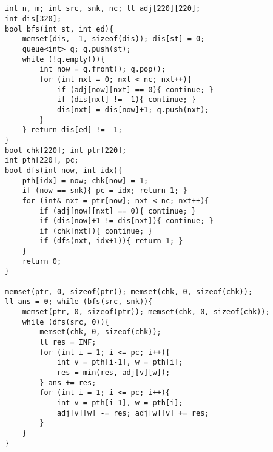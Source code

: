 \documentclass[landscape, 8pt, a4paper, oneside, twocolumn]{extarticle}
\begin{document}
\subsection{}
\begin{verbatim}
int n, m; int src, snk, nc; ll adj[220][220];
int dis[320];
bool bfs(int st, int ed){
    memset(dis, -1, sizeof(dis)); dis[st] = 0;
    queue<int> q; q.push(st);
    while (!q.empty()){
        int now = q.front(); q.pop();
        for (int nxt = 0; nxt < nc; nxt++){
            if (adj[now][nxt] == 0){ continue; }
            if (dis[nxt] != -1){ continue; }
            dis[nxt] = dis[now]+1; q.push(nxt);
        }
    } return dis[ed] != -1;
}
bool chk[220]; int ptr[220];
int pth[220], pc;
bool dfs(int now, int idx){
    pth[idx] = now; chk[now] = 1;
    if (now == snk){ pc = idx; return 1; }
    for (int& nxt = ptr[now]; nxt < nc; nxt++){
        if (adj[now][nxt] == 0){ continue; }
        if (dis[now]+1 != dis[nxt]){ continue; }
        if (chk[nxt]){ continue; }
        if (dfs(nxt, idx+1)){ return 1; }
    }
    return 0;
}

memset(ptr, 0, sizeof(ptr)); memset(chk, 0, sizeof(chk));
ll ans = 0; while (bfs(src, snk)){
    memset(ptr, 0, sizeof(ptr)); memset(chk, 0, sizeof(chk));
    while (dfs(src, 0)){
        memset(chk, 0, sizeof(chk));
        ll res = INF;
        for (int i = 1; i <= pc; i++){
            int v = pth[i-1], w = pth[i];
            res = min(res, adj[v][w]);
        } ans += res;
        for (int i = 1; i <= pc; i++){
            int v = pth[i-1], w = pth[i];
            adj[v][w] -= res; adj[w][v] += res;
        }
    }
}
\end{verbatim}
\subsection{}
\subsection{}
\end{document}
